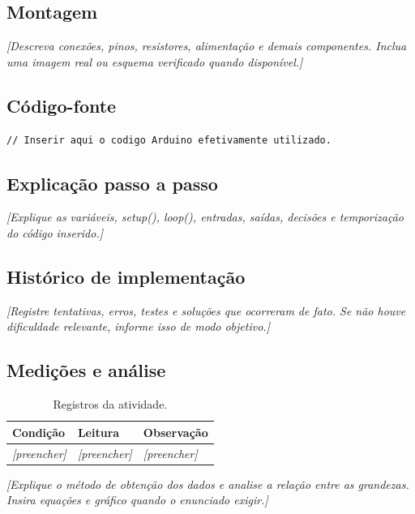 \documentclass[12pt,a4paper]{article}
\begin{document}
\subsection{Montagem}
\textit{[Descreva conexões, pinos, resistores, alimentação e demais componentes. Inclua uma imagem real ou esquema verificado quando disponível.]}


\subsection{Código-fonte}
\begin{lstlisting}[caption={Código da atividade},label={lst:atividade}]
// Inserir aqui o codigo Arduino efetivamente utilizado.
\end{lstlisting}

\subsection{Explicação passo a passo}
\textit{[Explique as variáveis, setup(), loop(), entradas, saídas, decisões e temporização do código inserido.]}

\subsection{Histórico de implementação}
\textit{[Registre tentativas, erros, testes e soluções que ocorreram de fato. Se não houve dificuldade relevante, informe isso de modo objetivo.]}

\subsection{Medições e análise}
\begin{table}[H]
  \centering
  \caption{Registros da atividade.}
  \label{tab:medicoes-atividade}
  \begin{tabular}{p{}p{}p{}}
    \toprule
    Condição & Leitura & Observação \\
    \midrule
    \textit{[preencher]} & \textit{[preencher]} & \textit{[preencher]} \\
    \bottomrule
  \end{tabular}
\end{table}
\textit{[Explique o método de obtenção dos dados e analise a relação entre as grandezas. Insira equações e gráfico quando o enunciado exigir.]}
\end{document}
